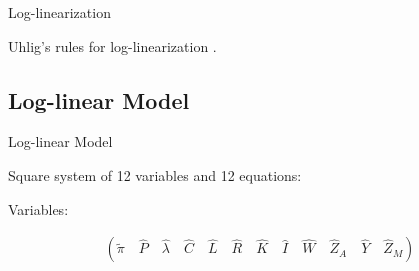 \documentclass[../quali_slides.tex]{subfiles}
\begin{document}

\begin{frame}{Log-linearization}
	
	Uhlig's rules for log-linearization \cite{uhlig_toolkit_1999}.
	
\end{frame}


\subsection{Log-linear Model}

\begin{frame}[allowframebreaks]{Log-linear Model}

	Square system of 12 variables and 12 equations:
	
	Variables:
	
	\begin{align}
		\left( \tilde{\pi} \quad \hat{P} \quad \hat{\lambda} \quad \hat{C} \quad \hat{L} \quad \hat{R} \quad \hat{K} \quad \hat{I} \quad \hat{W} \quad \hat{Z}_A \quad \hat{Y} \quad \hat{Z}_M \right)
	\end{align}
	
\end{frame}

\end{document}
